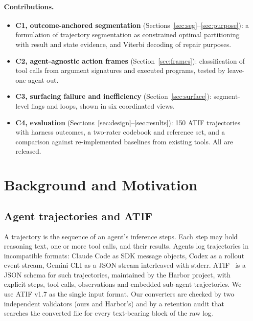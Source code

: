 \documentclass[sigconf,nonacm,10pt]{acmart}
\begin{document}
\paragraph{Contributions.}
\begin{itemize}
  \item \textbf{C1, outcome-anchored segmentation}
        (Sections~\ref{sec:seg}--\ref{sec:purpose}): a formulation of trajectory
        segmentation as constrained optimal partitioning with result and state
        evidence, and Viterbi decoding of repair purposes.
  \item \textbf{C2, agent-agnostic action frames} (Section~\ref{sec:frames}):
        classification of tool calls from argument signatures and executed
        programs, tested by leave-one-agent-out.
  \item \textbf{C3, surfacing failure and inefficiency} (Section~\ref{sec:surface}):
        segment-level flags and loops, shown in six coordinated views.
  \item \textbf{C4, evaluation} (Sections~\ref{sec:design}--\ref{sec:results}):
        150 ATIF trajectories with harness outcomes, a two-rater codebook and
        reference set, and a comparison against re-implemented baselines from
        existing tools. All are released.
\end{itemize}

\section{Background and Motivation}
\label{sec:background}

\subsection{Agent trajectories and ATIF}
A trajectory is the sequence of an agent's inference steps. Each step may hold
reasoning text, one or more tool calls, and their results. Agents log trajectories
in incompatible formats: Claude Code as SDK message objects, Codex as a rollout
event stream, Gemini CLI as a JSON stream interleaved with stderr. ATIF~\cite{atif2026}
is a JSON schema for such trajectories, maintained by the Harbor project, with
explicit steps, tool calls, observations and embedded sub-agent trajectories. We use
ATIF v1.7 as the single input format. Our converters are checked by two independent
validators (ours and Harbor's) and by a retention audit that searches the converted
file for every text-bearing block of the raw log.
\end{document}
